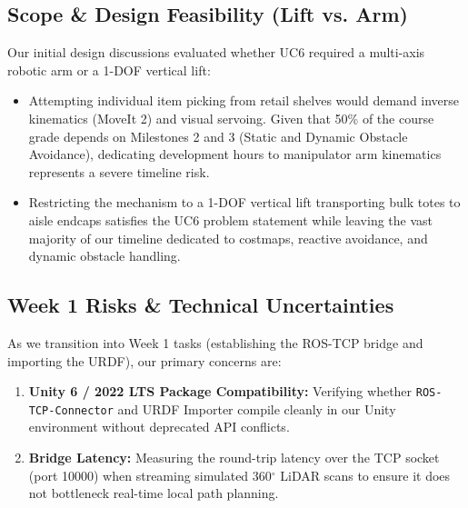 \documentclass[12pt,a4paper]{article}
\begin{document}
\subsection{Scope \& Design Feasibility (Lift vs. Arm)}
Our initial design discussions evaluated whether UC6 required a multi-axis robotic arm or a 1-DOF vertical lift:
\begin{itemize}
    \item Attempting individual item picking from retail shelves would demand inverse kinematics (MoveIt 2) and visual servoing. Given that 50\% of the course grade depends on Milestones 2 and 3 (Static and Dynamic Obstacle Avoidance), dedicating development hours to manipulator arm kinematics represents a severe timeline risk.
    \item Restricting the mechanism to a 1-DOF vertical lift transporting bulk totes to aisle endcaps satisfies the UC6 problem statement while leaving the vast majority of our timeline dedicated to costmaps, reactive avoidance, and dynamic obstacle handling.
\end{itemize}

\subsection{Week 1 Risks \& Technical Uncertainties}
As we transition into Week 1 tasks (establishing the ROS-TCP bridge and importing the URDF), our primary concerns are:
\begin{enumerate}
    \item \textbf{Unity 6 / 2022 LTS Package Compatibility:} Verifying whether \texttt{ROS-TCP-Connector} and URDF Importer compile cleanly in our Unity environment without deprecated API conflicts.
    \item \textbf{Bridge Latency:} Measuring the round-trip latency over the TCP socket (port 10000) when streaming simulated 360$^\circ$ LiDAR scans to ensure it does not bottleneck real-time local path planning.
\end{enumerate}
\end{document}
